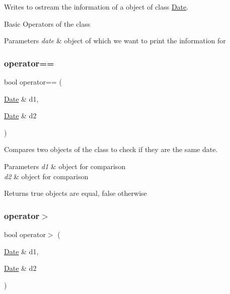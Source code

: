 Writes to ostream the information of a object of class \hyperlink{class_date}{Date}. 

Basic Operators of the class 
\begin{DoxyParams}{Parameters}
{\em date} & object of which we want to print the information for \\
\hline
\end{DoxyParams}
\mbox{\label{group___date_gaa932959bdd56052bc683d29b8748898f}} 
\subsubsection{\texorpdfstring{operator==}{operator==}}
{\footnotesize\ttfamily bool operator== (\begin{DoxyParamCaption}\item[{\hyperlink{class_date}{Date} \&}]{d1,  }\item[{\hyperlink{class_date}{Date} \&}]{d2 }\end{DoxyParamCaption})\hspace{0.3cm}{\ttfamily [friend]}}



Compares two objects of the class to check if they are the same date. 


\begin{DoxyParams}{Parameters}
{\em d1} & object for comparison \\
\hline
{\em d2} & object for comparison\\
\hline
\end{DoxyParams}
\begin{DoxyReturn}{Returns}
true objects are equal, false otherwise 
\end{DoxyReturn}
\mbox{\label{group___date_ga3d72003c210f3adc692715148aa7cf26}} 
\subsubsection{\texorpdfstring{operator$>$}{operator>}}
{\footnotesize\ttfamily bool operator$>$ (\begin{DoxyParamCaption}\item[{\hyperlink{class_date}{Date} \&}]{d1,  }\item[{\hyperlink{class_date}{Date} \&}]{d2 }\end{DoxyParamCaption})\hspace{0.3cm}{\ttfamily [friend]}}



